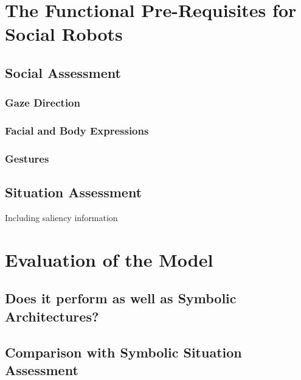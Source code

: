 \documentclass[a4paper]{article}
\begin{document}
\section{The Functional Pre-Requisites for Social Robots}

\subsection{Social Assessment}

\subsubsection{Gaze Direction}
\subsubsection{Facial and Body Expressions}
\subsubsection{Gestures}

\subsection{Situation Assessment}

Including saliency information

\section{Evaluation of the Model}

\subsection{Does it perform as well as Symbolic Architectures?}
\subsection{Comparison with Symbolic Situation Assessment}






\end{document}
